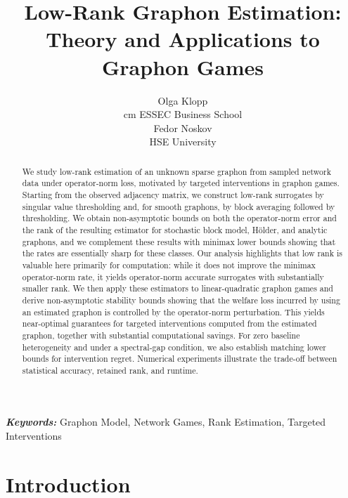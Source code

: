 \documentclass[11pt]{article}
\title{Low-Rank Graphon Estimation: Theory and Applications to Graphon Games}
\author{Olga Klopp \\\vskip -0.4 cm ESSEC Business School\\
Fedor Noskov \\ HSE University 
        }
\date{}
\newcommand{\<}{\langle}
\renewcommand{\>}{\rangle}
\theoremstyle{plain}
\theoremstyle{definition}
\theoremstyle{remark}
\providecommand{\keywords}[1]
{
  \textbf{\textit{Keywords:}} #1
}
\providecommand{\funding}[1]
{
  \textbf{\textit{Funding:}} #1
}
\begin{document}
\maketitle
\begin{abstract}
We study low-rank estimation of an unknown sparse graphon from sampled network data under operator-norm loss, motivated by targeted interventions in graphon games. Starting from the observed adjacency matrix, we construct low-rank surrogates by singular value thresholding and, for smooth graphons, by block averaging followed by thresholding. We obtain non-asymptotic bounds on both the operator-norm error and the rank of the resulting estimator for stochastic block model, Hölder, and analytic graphons, and we complement these results with minimax lower bounds showing that the rates are essentially sharp for these classes. Our analysis highlights that low rank is valuable here primarily for computation: while it does not improve the minimax operator-norm rate, it yields operator-norm accurate surrogates with substantially smaller rank. We then apply these estimators to linear-quadratic graphon games and derive non-asymptotic stability bounds showing that the welfare loss incurred by using an estimated graphon is controlled by the operator-norm perturbation. This yields near-optimal guarantees for targeted interventions computed from the estimated graphon, together with substantial computational savings. For zero baseline heterogeneity and under a spectral-gap condition, we also establish matching lower bounds for intervention regret. Numerical experiments illustrate the trade-off between statistical accuracy, retained rank, and runtime.

\end{abstract}
\keywords
{Graphon Model, Network Games, Rank Estimation, Targeted Interventions}\\








\section{Introduction}

\end{document}
